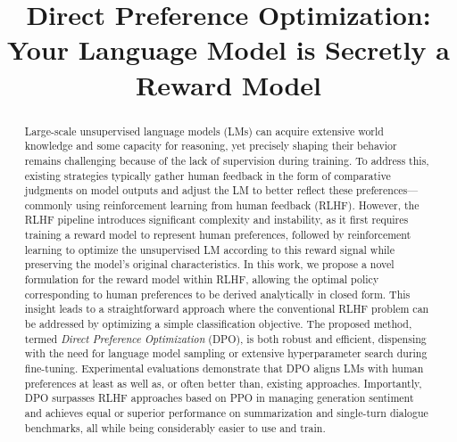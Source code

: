 \title{Direct Preference Optimization: Your Language Model is Secretly a Reward Model}

\begin{abstract}
Large-scale unsupervised language models (LMs) can acquire extensive world knowledge and some capacity for reasoning, yet precisely shaping their behavior remains challenging because of the lack of supervision during training. To address this, existing strategies typically gather human feedback in the form of comparative judgments on model outputs and adjust the LM to better reflect these preferences—commonly using reinforcement learning from human feedback (RLHF). However, the RLHF pipeline introduces significant complexity and instability, as it first requires training a reward model to represent human preferences, followed by reinforcement learning to optimize the unsupervised LM according to this reward signal while preserving the model’s original characteristics. In this work, we propose a novel formulation for the reward model within RLHF, allowing the optimal policy corresponding to human preferences to be derived analytically in closed form. This insight leads to a straightforward approach where the conventional RLHF problem can be addressed by optimizing a simple classification objective. The proposed method, termed \textit{Direct Preference Optimization} (DPO), is both robust and efficient, dispensing with the need for language model sampling or extensive hyperparameter search during fine-tuning. Experimental evaluations demonstrate that DPO aligns LMs with human preferences at least as well as, or often better than, existing approaches. Importantly, DPO surpasses RLHF approaches based on PPO in managing generation sentiment and achieves equal or superior performance on summarization and single-turn dialogue benchmarks, all while being considerably easier to use and train.
\end{abstract}

